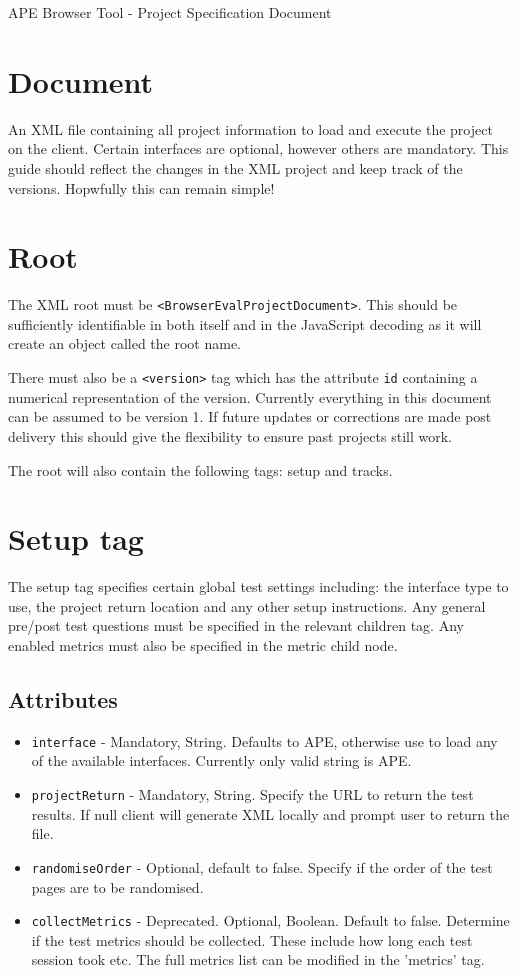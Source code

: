 \documentclass{article}
\begin{document}
\large APE Browser Tool - Project Specification Document

\section{Document}

An XML file containing all project information to load and execute the project on the client. Certain interfaces are optional, however others are mandatory. This guide should reflect the changes in the XML project and keep track of the versions. Hopwfully this can remain simple!

\section{Root}

The XML root must be \texttt{<BrowserEvalProjectDocument>}. This should be sufficiently identifiable in both itself and in the JavaScript decoding as it will create an object called the root name.

There must also be a \texttt{<version>} tag which has the attribute \texttt{id} containing a numerical representation of the version. Currently everything in this document can be assumed to be version 1. If future updates or corrections are made post delivery this should give the flexibility to ensure past projects still work.

The root will also contain the following tags: setup and tracks.

\section{Setup tag}

The setup tag specifies certain global test settings including: the interface type to use, the project return location and any other setup instructions.
Any general pre/post test questions must be specified in the relevant children tag. Any enabled metrics must also be specified in the metric child node.

\subsection{Attributes}
\begin{itemize}
\item \texttt{interface} - Mandatory, String. Defaults to APE, otherwise use to load any of the available interfaces. Currently only valid string is APE.
\item \texttt{projectReturn} - Mandatory, String. Specify the URL to return the test results. If null client will generate XML locally and prompt user to return the file.
\item \texttt{randomiseOrder} - Optional, default to false. Specify if the order of the test pages are to be randomised.
\item \texttt{collectMetrics} - Deprecated. Optional, Boolean. Default to false. Determine if the test metrics should be collected. These include how long each test session took etc. The full metrics list can be modified in the 'metrics' tag.
\end{itemize}
\end{document}
